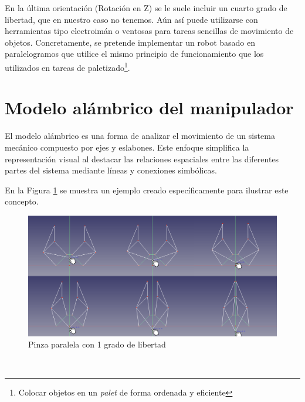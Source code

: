 En la última orientación (Rotación en Z) se le suele incluir un cuarto grado de libertad, que en nuestro caso no tenemos. Aún así puede utilizarse con 
herramientas tipo electroimán o ventosas para tareas sencillas de movimiento de objetos. Concretamente, se pretende implementar un robot basado en paralelogramos que utilice el mismo principio de funcionamiento que los utilizados en 
tareas de paletizado\footnote{Colocar objetos en un \textit{palet} de forma ordenada y eficiente}.

\section{Modelo alámbrico del manipulador}
\noindent El modelo alámbrico es una forma de analizar el movimiento de un sistema mecánico compuesto por ejes y eslabones. Este 
enfoque simplifica la representación visual al destacar las relaciones espaciales entre las diferentes partes del sistema mediante 
líneas y conexiones simbólicas.

En la Figura \ref{fig:mod_pinza_figure} se muestra un ejemplo creado específicamente para ilustrar este concepto.
\begin{figure} [ht!]
  \begin{center}
    \includegraphics[width=15cm]{figs/pinza_evol.png}
  \end{center}
  \caption{Pinza paralela con 1 grado de libertad}
  \label{fig:mod_pinza_figure}
\end{figure}\ 

